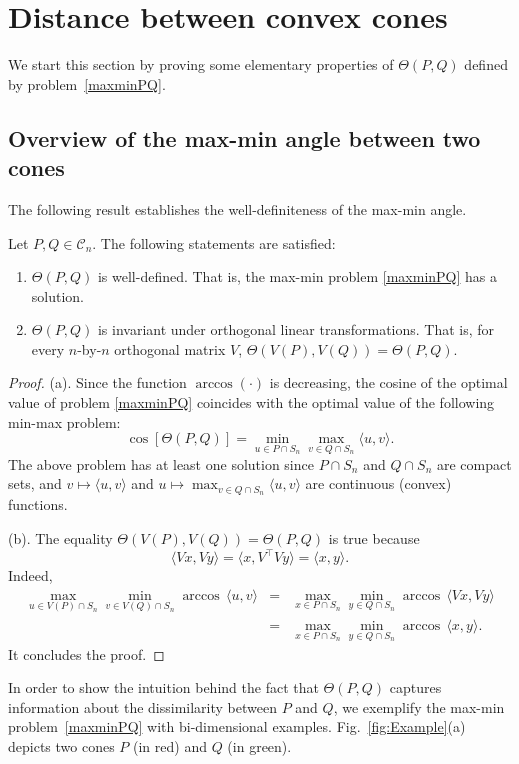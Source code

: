 \documentclass[hidelinks,onefignum,onetabnum]{siamart250211}
\theoremstyle{definition}
\theoremstyle{remark}
\newcommand{\CC}{\mathcal C}
\newcommand{\inner}[2]{\langle#1,#2\rangle}
\begin{document}
\section{Distance between convex cones}\label{sec:dist}
We start this section by proving some elementary properties of $\Theta(P,Q)$ defined by problem~\eqref{maxminPQ}.
%
\subsection{Overview of the max-min angle between two cones}
%
The following result establishes the well-definiteness of the max-min angle.
\begin{proposition}\label{pr:elementary}
Let $P,Q\in\CC_n$. The following statements are satisfied:
\begin{enumerate}
\item[(a)] $\Theta(P,Q)$ is well-defined. That is, the max-min problem \eqref{maxminPQ} has a solution.
\item[(b)] $\Theta(P,Q)$ is invariant under orthogonal linear transformations. That is, for every $n$-by-$n$ orthogonal matrix $V$, $\Theta(V(P),V(Q))=\Theta(P,Q)$.
\end{enumerate}
\end{proposition}
\begin{proof}
(a). Since the function $\arccos(\cdot)$ is decreasing, the cosine of the optimal value of problem \eqref{maxminPQ}  coincides with the optimal value of the following min-max problem:
\[\cos[\Theta(P,Q)]=\min_{u\in P\cap S_n}\max_{v\in Q\cap S_n}\langle u,v\rangle.\]
The above problem has at least one solution since $P\cap S_n$ and $Q\cap S_n$ are compact sets, and $v\mapsto\langle u,v\rangle$ and $u\mapsto\max_{v\in Q\cap S_n}\langle u,v\rangle$ are continuous (convex) functions.

(b). The equality $\Theta(V(P),V(Q))=\Theta(P,Q)$ is true because 
\[\inner{Vx}{Vy} = \inner{x}{V^\top Vy}  = \inner{x}{y}.\]
Indeed,
\begin{eqnarray*}
\max_{u\in V(P)\cap S_n}\min_{v\in V(Q)\cap S_n}\arccos\,\inner{u}{v}&=&
\max_{x\in P\cap S_n}\min_{y\in Q\cap S_n}\arccos\,\inner{Vx}{Vy}\\
&=&\max_{x\in P\cap S_n}\min_{y\in Q\cap S_n}\arccos\,\inner{x}{y}.
\end{eqnarray*}
It concludes the proof.
\end{proof}
In order to show the intuition behind the fact that $\Theta(P,Q)$ captures information about the dissimilarity between $P$ and $Q$, we exemplify the max-min problem~\eqref{maxminPQ} with bi-dimensional examples. Fig.~\ref{fig:Example}(a) depicts two cones $P$ (in red) and $Q$ (in green).
\end{document}
